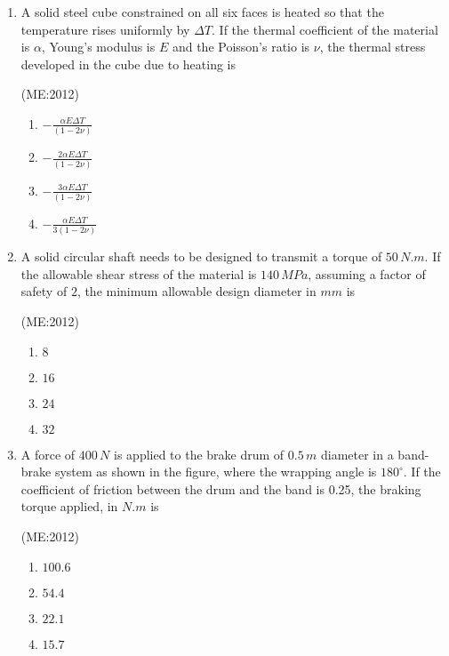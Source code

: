 \documentclass[journal,12pt,onecolumn]{IEEEtran}
\theoremstyle{remark}
\begin{document}
\begin{enumerate}
    \item A solid steel cube constrained on all six faces is heated so that the temperature rises uniformly by $\Delta T$. If the thermal coefficient of the material is $\alpha$, Young's modulus is $E$ and the Poisson's ratio is $\nu$, the thermal stress developed in the cube due to heating is

	     \hfill{(ME:2012)}
		\begin{multicols}{4}
    \begin{enumerate}
	    \item $-\frac{\alpha E \Delta T}{(1 - 2\nu)}$
	    \item $-\frac{2 \alpha E \Delta T}{(1 - 2\nu)}$
	    \item $-\frac{3 \alpha E \Delta T}{(1 - 2\nu)}$
        \item $-\frac{\alpha E \Delta T}{3(1 - 2\nu)}$
    \end{enumerate}
		\end{multicols}

    \item 
	    A solid circular shaft needs to be designed to transmit a torque of $50 \, N.m$. If the allowable shear stress of the material is $140 \, MPa$, assuming a factor of safety of $2$, the minimum allowable design diameter in $mm$ is

		 \hfill{(ME:2012)}
		\begin{multicols}{4}
    \begin{enumerate}
        \item $8$
        \item $16$
        \item $24$
        \item $32$
    \end{enumerate}
		\end{multicols}

    \item 
	    A force of $400 \, N$ is applied to the brake drum of $0.5 \, m$ diameter in a band-brake system as shown in the figure, where the wrapping angle is $180^\circ$. If the coefficient of friction between the drum and the band is 0.25, the braking torque applied, in $N.m$ is
		\vspace{1cm}
		\begin{center}
			
		\end{center}

		 \hfill{(ME:2012)}
\begin{multicols}{4}
    \begin{enumerate}
        \item $100.6$
        \item $54.4$
        \item $22.1$
        \item $15.7$
    \end{enumerate}
\end{multicols}


\end{enumerate}
\end{document}
